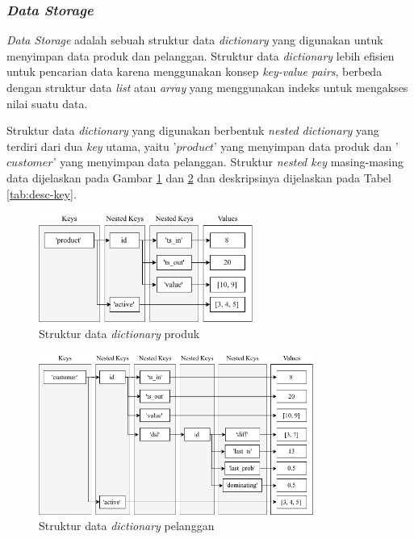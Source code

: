 \subsubsection{\textit{Data Storage}}
\tab \textit{Data Storage} adalah sebuah struktur data \textit{dictionary} yang digunakan untuk menyimpan data produk dan pelanggan. Struktur data \textit{dictionary} lebih efisien untuk pencarian data karena menggunakan konsep \textit{key-value pairs}, berbeda dengan struktur data \textit{list} atau \textit{array} yang menggunakan indeks untuk mengakses nilai suatu data.

Struktur data \textit{dictionary} yang digunakan berbentuk \textit{nested dictionary} yang terdiri dari dua \textit{key} utama, yaitu '$product$' yang menyimpan data produk dan '$customer$' yang menyimpan data pelanggan. Struktur \textit{nested key} masing-masing data dijelaskan pada Gambar \ref{fig:sd1} dan \ref{fig:sd2} dan deskripsinya dijelaskan pada Tabel \ref{tab:desc-key}.

\begin{figure}[H]
	\centering
	\includegraphics[width=7cm]{assets/img/bab3/sd1.png}
	\caption{Struktur data \textit{dictionary} produk}
	\label{fig:sd1}
\end{figure}

\begin{figure}[H]
	\centering
	\includegraphics[width=9cm]{assets/img/bab3/sd2.png}
	\caption{Struktur data \textit{dictionary} pelanggan}
	\label{fig:sd2}
\end{figure}

